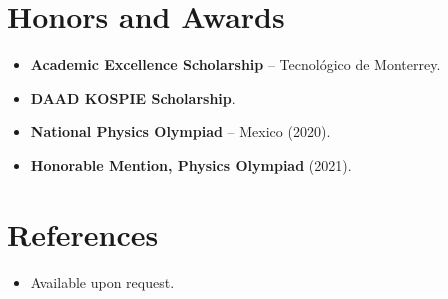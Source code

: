 \documentclass[11pt,a4paper,sans]{moderncv}
\begin{document}

\section{Honors and Awards}
\vspace{1pt}
\begin{itemize}
\item{\textbf{Academic Excellence Scholarship} -- Tecnológico de Monterrey.}
\item{\textbf{DAAD KOSPIE Scholarship}.}
\item{\textbf{National Physics Olympiad} -- Mexico (2020).}
\item{\textbf{Honorable Mention, Physics Olympiad} (2021).}
\end{itemize}


\section{References}
\vspace{1pt}
\begin{itemize}
\item{Available upon request.}
\end{itemize}
\end{document}
